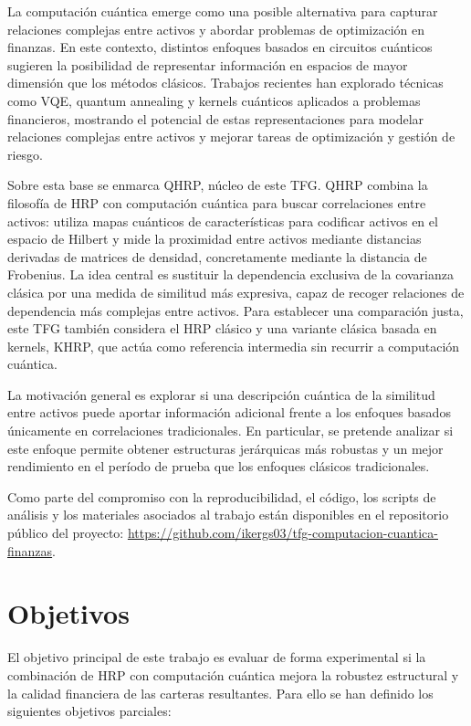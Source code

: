 La computación cuántica emerge como una posible alternativa para capturar relaciones complejas entre activos y abordar problemas de optimización en finanzas. En este contexto, distintos enfoques basados en circuitos cuánticos sugieren la posibilidad de representar información en espacios de mayor dimensión que los métodos clásicos. Trabajos recientes han explorado técnicas como \gls{VQE}\cite{peruzzo2014vqe}, quantum annealing\cite{kadowaki1998quantumannealing} y kernels cuánticos aplicados a problemas financieros, mostrando el potencial de estas representaciones para modelar relaciones complejas entre activos y mejorar tareas de optimización y gestión de riesgo.


Sobre esta base se enmarca \gls{QHRP}\cite{arian2025qhrp}, núcleo de este TFG. \gls{QHRP} combina la filosofía de \gls{HRP} con computación cuántica para buscar correlaciones entre activos: utiliza mapas cuánticos de características para codificar activos en el espacio de Hilbert y mide la proximidad entre activos mediante distancias derivadas de matrices de densidad, concretamente mediante la distancia de Frobenius. La idea central es sustituir la dependencia exclusiva de la covarianza clásica por una medida de similitud más expresiva, capaz de recoger relaciones de dependencia más complejas entre activos. Para establecer una comparación justa, este TFG también considera el \gls{HRP} clásico y una variante clásica basada en kernels, \gls{KHRP}, que actúa como referencia intermedia sin recurrir a computación cuántica.

La motivación general es explorar si una descripción cuántica de la similitud entre activos puede aportar información adicional frente a los enfoques basados únicamente en correlaciones tradicionales. En particular, se pretende analizar si este enfoque permite obtener estructuras jerárquicas más robustas y un mejor rendimiento en el período de prueba que los enfoques clásicos tradicionales.

Como parte del compromiso con la reproducibilidad, el código, los scripts de análisis y los materiales asociados al trabajo están disponibles en el repositorio público del proyecto: \url{https://github.com/ikergs03/tfg-computacion-cuantica-finanzas}.


\section{Objetivos}
\label{sec:objetivos}
El objetivo principal de este trabajo es evaluar de forma experimental si la combinación de \gls{HRP} con computación cuántica mejora la robustez estructural y la calidad financiera de las carteras resultantes. Para ello se han definido los siguientes objetivos parciales:

